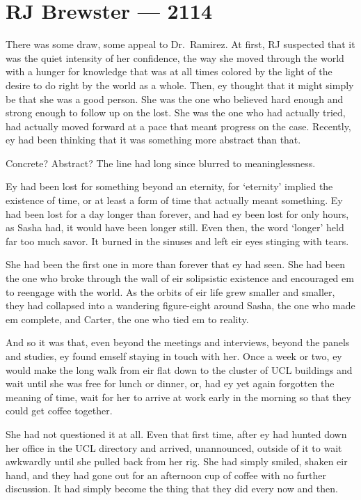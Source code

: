 \hypertarget{rj-brewster-2114}{%
\chapter{RJ Brewster — 2114}\label{rj-brewster-2114}}

There was some draw, some appeal to Dr.~Ramirez. At first, RJ suspected that it was the quiet intensity of her confidence, the way she moved through the world with a hunger for knowledge that was at all times colored by the light of the desire to do right by the world as a whole. Then, ey thought that it might simply be that she was a good person. She was the one who believed hard enough and strong enough to follow up on the lost. She was the one who had actually tried, had actually moved forward at a pace that meant progress on the case. Recently, ey had been thinking that it was something more abstract than that.

Concrete? Abstract? The line had long since blurred to meaninglessness.

Ey had been lost for something beyond an eternity, for `eternity' implied the existence of time, or at least a form of time that actually meant something. Ey had been lost for a day longer than forever, and had ey been lost for only hours, as Sasha had, it would have been longer still. Even then, the word `longer' held far too much savor. It burned in the sinuses and left eir eyes stinging with tears.

She had been the first one in more than forever that ey had seen. She had been the one who broke through the wall of eir solipsistic existence and encouraged em to reengage with the world. As the orbits of eir life grew smaller and smaller, they had collapsed into a wandering figure-eight around Sasha, the one who made em complete, and Carter, the one who tied em to reality.

And so it was that, even beyond the meetings and interviews, beyond the panels and studies, ey found emself staying in touch with her. Once a week or two, ey would make the long walk from eir flat down to the cluster of UCL buildings and wait until she was free for lunch or dinner, or, had ey yet again forgotten the meaning of time, wait for her to arrive at work early in the morning so that they could get coffee together.

She had not questioned it at all. Even that first time, after ey had hunted down her office in the UCL directory and arrived, unannounced, outside of it to wait awkwardly until she pulled back from her rig. She had simply smiled, shaken eir hand, and they had gone out for an afternoon cup of coffee with no further discussion. It had simply become the thing that they did every now and then.

